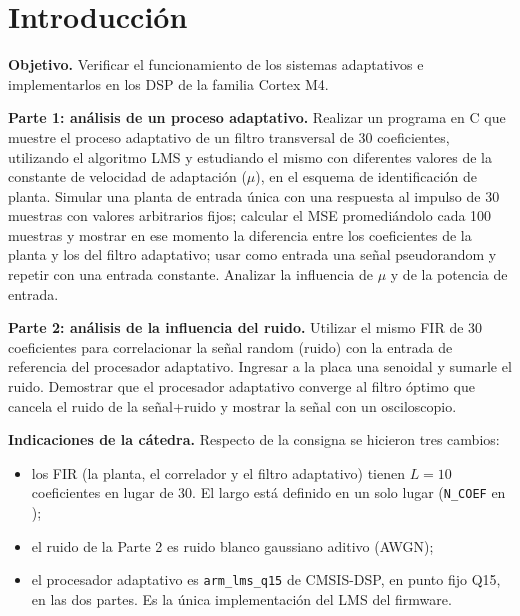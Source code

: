 \documentclass[11pt,a4paper]{article}
\newcommand{\lmsq}{\texttt{arm\_lms\_q15}}
\begin{document}
\caratula
\setcounter{tocdepth}{2}
\tableofcontents
\newpage

\section{Introducción}

\begin{consigna}
\textbf{Objetivo.} Verificar el funcionamiento de los sistemas adaptativos e
implementarlos en los DSP de la familia Cortex M4.

\textbf{Parte 1: análisis de un proceso adaptativo.} Realizar un programa en C
que muestre el proceso adaptativo de un filtro transversal de 30 coeficientes,
utilizando el algoritmo LMS y estudiando el mismo con diferentes valores de la
constante de velocidad de adaptación ($\mu$), en el esquema de identificación
de planta. Simular una planta de entrada única con una respuesta al impulso de
30 muestras con valores arbitrarios fijos; calcular el MSE promediándolo cada
100 muestras y mostrar en ese momento la diferencia entre los coeficientes de
la planta y los del filtro adaptativo; usar como entrada una señal
pseudorandom y repetir con una entrada constante. Analizar la influencia de
$\mu$ y de la potencia de entrada.

\textbf{Parte 2: análisis de la influencia del ruido.} Utilizar el mismo FIR de
30 coeficientes para correlacionar la señal random (ruido) con la entrada de
referencia del procesador adaptativo. Ingresar a la placa una senoidal y
sumarle el ruido. Demostrar que el procesador adaptativo converge al filtro
óptimo que cancela el ruido de la señal+ruido y mostrar la señal con un
osciloscopio.
\end{consigna}

\textbf{Indicaciones de la cátedra.} Respecto de la consigna se hicieron tres cambios:
\begin{itemize}
  \item los FIR (la planta, el correlador y el filtro adaptativo) tienen $L = 10$ coeficientes
  en lugar de 30. El largo está definido en un solo lugar (\texttt{N\_COEF} en
  );
  \item el ruido de la Parte 2 es ruido blanco gaussiano aditivo (AWGN);
  \item el procesador adaptativo es \lmsq{} de CMSIS-DSP, en punto fijo Q15, en las dos partes.
  Es la única implementación del LMS del firmware.
\end{itemize}
\end{document}
